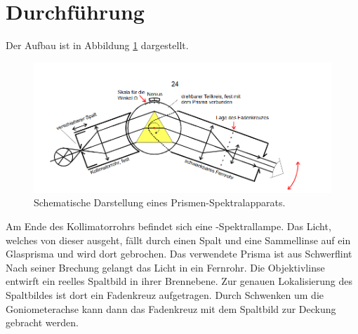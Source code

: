 \section{Durchführung}
\label{sec:Durchführung}
Der Aufbau ist in Abbildung \ref{fig:spek} dargestellt.
\begin{figure}[H]
  \centering
  \includegraphics[width=\textwidth]{content/pris_spek.png}
  \caption{Schematische Darstellung eines Prismen-Spektralapparats\cite{v402}.}
  \label{fig:spek}
\end{figure}
\noindent Am Ende des Kollimatorrohrs befindet sich eine -Spektrallampe.
Das Licht, welches von dieser ausgeht, fällt durch einen Spalt und eine Sammellinse auf ein Glasprisma und wird dort gebrochen.
Das verwendete Prisma ist aus Schwerflint
Nach seiner Brechung gelangt das Licht in ein Fernrohr.
Die Objektivlinse entwirft ein reelles Spaltbild in ihrer Brennebene.
Zur genauen Lokalisierung des Spaltbildes ist dort ein Fadenkreuz aufgetragen.
Durch Schwenken um die Goniometerachse kann dann das Fadenkreuz mit dem Spaltbild zur Deckung gebracht werden.
